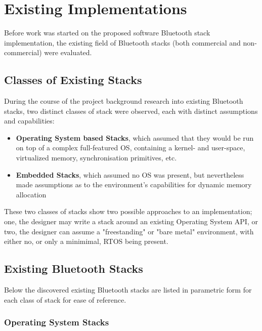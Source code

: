 \chapter{Existing Implementations}
\label{Chapter 2}

Before work was started on the proposed software Bluetooth stack implementation, the existing field of Bluetooth stacks (both commercial and non-commercial) were evaluated.

\section{Classes of Existing Stacks}

During the course of the project background research into existing Bluetooth stacks, two distinct classes of stack were observed, each with distinct assumptions and capabilities:

\begin{itemize}
	\item \textbf{Operating System based Stacks}, which assumed that they would be run on top of a complex full-featured OS, containing a kernel- and user-space, virtualized memory, synchronisation primitives, etc.
	\item \textbf{Embedded Stacks}, which assumed no OS was present, but nevertheless made assumptions as to the environment's capabilities for dynamic memory allocation
\end{itemize}

These two classes of stacks show two possible approaches to an implementation; one, the designer may write a stack around an existing Operating System API, or two, the designer can assume a "freestanding" or "bare metal" environment, with either no, or only a minimimal, RTOS being present.

\section{Existing Bluetooth Stacks}

Below the discovered existing Bluetooth stacks are listed in parametric form for each class of stack for ease of reference.

\subsection{Operating System Stacks}


